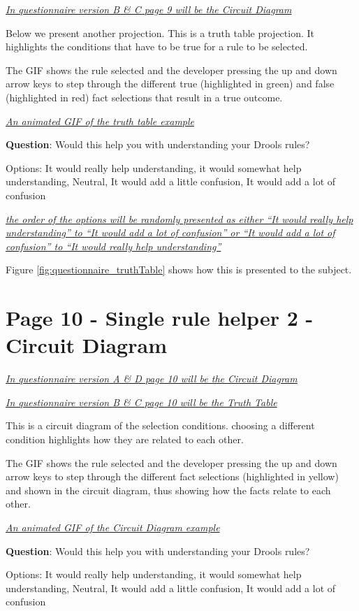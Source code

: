\emph{\underline{In questionnaire version B \& C page 9 will be the Circuit Diagram}}

Below we present another projection.
This is a truth table projection.
It highlights the conditions that have to be true for a rule to be selected.

The GIF shows the rule selected and the developer pressing the up and down arrow keys to step through the different true (highlighted in green)  and false (highlighted in red) fact selections that result in a true outcome.

\emph{\underline{An animated GIF of the truth table example}}

\textbf{Question}: Would this help you with understanding your Drools rules?

Options: It would really help understanding, it would somewhat help understanding, Neutral, It would add a little confusion, It would add a lot of confusion

\emph{\underline{the order of the options will be randomly presented as either ``It would really help understanding'' to ``It would add a lot of confusion'' or ``It would add a lot of confusion'' to ``It would really help understanding''}}

Figure \ref{fig:questionnaire_truthTable} shows how this is presented to the subject.

\section*{Page 10 - Single rule helper 2 - Circuit Diagram}
\emph{\underline{In questionnaire version A \& D page 10 will be the Circuit Diagram}}

\emph{\underline{In questionnaire version B \& C page 10 will be the Truth Table}}

This is a circuit diagram of the selection conditions.
choosing a different condition highlights how they are related to each other.

The GIF shows the rule selected and the developer pressing the up and down arrow keys to step through the different fact selections (highlighted in yellow) and shown in the circuit diagram, thus showing how the facts relate to each other.

\emph{\underline{An animated GIF of the Circuit Diagram example}}

\textbf{Question}: Would this help you with understanding your Drools rules?

Options: It would really help understanding, it would somewhat help understanding, Neutral, It would add a little confusion, It would add a lot of confusion

